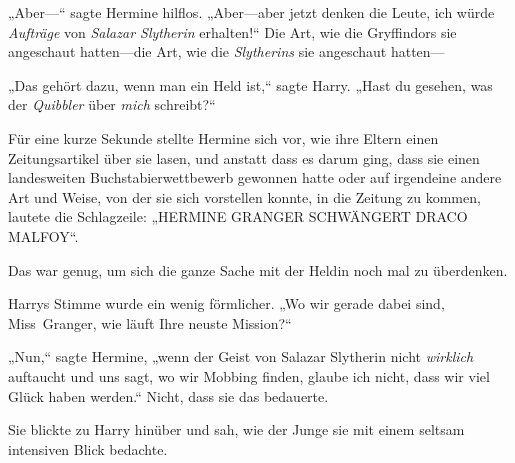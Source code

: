 „Aber—“ sagte Hermine hilflos. „Aber—aber jetzt denken die Leute, ich würde \emph{Aufträge} von \emph{Salazar Slytherin} erhalten!“ Die Art, wie die Gryffindors sie angeschaut hatten—die Art, wie die \emph{Slytherins} sie angeschaut hatten—

„Das gehört dazu, wenn man ein Held ist,“ sagte Harry. „Hast du gesehen, was der \emph{Quibbler} über \emph{mich} schreibt?“

Für eine kurze Sekunde stellte Hermine sich vor, wie ihre Eltern einen Zeitungsartikel über sie lasen, und anstatt dass es darum ging, dass sie einen landesweiten Buchstabierwettbewerb gewonnen hatte oder auf irgendeine andere Art und Weise, von der sie sich vorstellen konnte, in die Zeitung zu kommen, lautete die Schlagzeile: „HERMINE GRANGER SCHWÄNGERT DRACO MALFOY“.

Das war genug, um sich die ganze Sache mit der Heldin noch mal zu überdenken.

Harrys Stimme wurde ein wenig förmlicher. „Wo wir gerade dabei sind, Miss~Granger, wie läuft Ihre neuste Mission?“

„Nun,“ sagte Hermine, „wenn der Geist von Salazar Slytherin nicht \emph{wirklich} auftaucht und uns sagt, wo wir Mobbing finden, glaube ich nicht, dass wir viel Glück haben werden.“ Nicht, dass sie das bedauerte.

Sie blickte zu Harry hinüber und sah, wie der Junge sie mit einem seltsam intensiven Blick bedachte.

